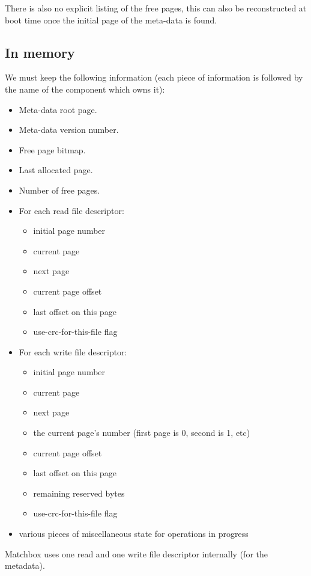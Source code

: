 \documentclass{article}
\begin{document}
There is also no explicit listing of the free pages, this can also be
reconstructed at boot time once the initial page of the meta-data is
found.

\subsection{In memory} 

We must keep the following information (each piece of information is
followed by the name of the component which owns it):
\begin{itemize}
\item Meta-data root page.
\item Meta-data version number.
\item Free page bitmap.
\item Last allocated page.
\item Number of free pages.
\item For each read file descriptor:
  \begin{itemize}
  \item initial page number
  \item current page
  \item next page
  \item current page offset
  \item last offset on this page
  \item use-crc-for-this-file flag
  \end{itemize}
\item For each write file descriptor:
  \begin{itemize}
  \item initial page number
  \item current page
  \item next page
  \item the current page's number (first page is 0, second is 1, etc)
  \item current page offset
  \item last offset on this page
  \item remaining reserved bytes
  \item use-crc-for-this-file flag
  \end{itemize}
\item various pieces of miscellaneous state for operations in progress
\end{itemize}

Matchbox uses one read and one write file descriptor internally (for the
metadata).
\end{document}
